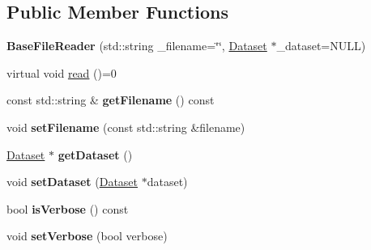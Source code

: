 \subsection*{Public Member Functions}
\begin{DoxyCompactItemize}
\item 
\hypertarget{classffactory_1_1_base_file_reader_a8d6a6ae99b1c1e5425e56fc90176e018}{{\bfseries Base\-File\-Reader} (std\-::string \-\_\-filename=\char`\"{}\char`\"{}, \hyperlink{classffactory_1_1_dataset}{Dataset} $\ast$\-\_\-dataset=N\-U\-L\-L)}\label{classffactory_1_1_base_file_reader_a8d6a6ae99b1c1e5425e56fc90176e018}

\item 
virtual void \hyperlink{classffactory_1_1_base_file_reader_ab8683144beea50394ec833163d575615}{read} ()=0
\item 
\hypertarget{classffactory_1_1_base_file_reader_a99ed2cb12be72b43273501146fc29163}{const std\-::string \& {\bfseries get\-Filename} () const }\label{classffactory_1_1_base_file_reader_a99ed2cb12be72b43273501146fc29163}

\item 
\hypertarget{classffactory_1_1_base_file_reader_a18d352a589ce02c9ab61793eb0a3e5a9}{void {\bfseries set\-Filename} (const std\-::string \&filename)}\label{classffactory_1_1_base_file_reader_a18d352a589ce02c9ab61793eb0a3e5a9}

\item 
\hypertarget{classffactory_1_1_base_file_reader_a3be5e024b10a4cc818e5c91c6c560262}{\hyperlink{classffactory_1_1_dataset}{Dataset} $\ast$ {\bfseries get\-Dataset} ()}\label{classffactory_1_1_base_file_reader_a3be5e024b10a4cc818e5c91c6c560262}

\item 
\hypertarget{classffactory_1_1_base_file_reader_a9b232c85c50435272cd73512ab67723e}{void {\bfseries set\-Dataset} (\hyperlink{classffactory_1_1_dataset}{Dataset} $\ast$dataset)}\label{classffactory_1_1_base_file_reader_a9b232c85c50435272cd73512ab67723e}

\item 
\hypertarget{classffactory_1_1_base_file_reader_accd449482bd147dda3aa63393e100d3e}{bool {\bfseries is\-Verbose} () const }\label{classffactory_1_1_base_file_reader_accd449482bd147dda3aa63393e100d3e}

\item 
\hypertarget{classffactory_1_1_base_file_reader_a543b5cae0d6a5503a09e857c5f06ca5e}{void {\bfseries set\-Verbose} (bool verbose)}\label{classffactory_1_1_base_file_reader_a543b5cae0d6a5503a09e857c5f06ca5e}

\end{DoxyCompactItemize}
